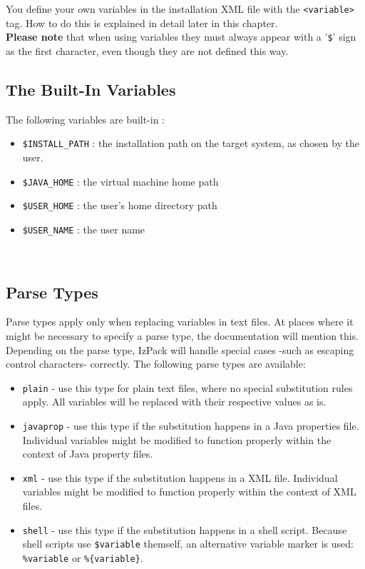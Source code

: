 You define your own variables in the installation XML file with the
\texttt{<variable>} tag. How to do this is explained in detail later in
this chapter.\\

\textbf{Please note} that when using variables they must always appear
with a '\texttt{\$}' sign as the first character, even though they are
not defined this way.\\

\subsection{The Built-In Variables}
The following variables are built-in :
\begin{itemize}
  \item \texttt{\$INSTALL\_PATH} : the installation path on the
        target system, as chosen by the user.
  \item \texttt{\$JAVA\_HOME} : the \Java virtual machine home path
  \item \texttt{\$USER\_HOME} : the user's home directory path
  \item \texttt{\$USER\_NAME} : the user name
\end{itemize}\

\subsection{Parse Types}
Parse types apply only when replacing variables in text files. At places
where it might be necessary to specify a parse type, the documentation
will mention this. Depending on the parse type, IzPack will handle
special cases -such as escaping control characters- correctly. The
following parse types are available:
\begin{itemize}
  \item \texttt{plain} - use this type for plain text files, where no
        special substitution rules apply. All variables will be
        replaced with their respective values as is.
  \item \texttt{javaprop} - use this type if the substitution happens
        in a Java properties file. Individual variables might be
        modified to function properly within the context of Java
        property files.
  \item \texttt{xml} - use this type if the substitution happens in
        a XML file. Individual variables might be modified to function
        properly within the context of XML files.
  \item \texttt{shell} - use this type if the substitution happens in
        a shell script. Because shell scripts use \texttt{\$variable} 
        themself, an alternative variable marker is used: 
        \texttt{\%variable} or \texttt{\%\{variable\}}.
\end{itemize}

